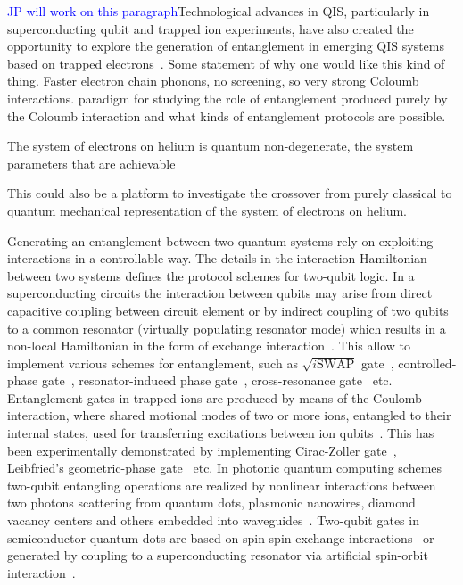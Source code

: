\documentclass[twocolumn,superscriptaddress,unsortedaddress,
 amsmath,amssymb,
 aps,
]{revtex4-2}
\begin{document}
\textcolor{blue}{JP will work on this paragraph}Technological advances in QIS, particularly in superconducting qubit and trapped ion experiments, have also created the opportunity to explore the generation of entanglement in emerging QIS systems based on trapped electrons~{}. Some statement of why one would like this kind of thing. Faster electron chain phonons, no screening, so very strong Coloumb interactions. paradigm for studying the role of entanglement produced purely by the Coloumb interaction and what kinds of entanglement protocols are possible.

The system of electrons on helium is quantum non-degenerate, the system parameters that are achievable 

This could also be a platform to investigate the crossover from purely classical to quantum mechanical representation of the system of electrons on helium. 

Generating an entanglement between two quantum systems rely on exploiting interactions in a controllable way. The details in the interaction Hamiltonian between two systems defines the protocol schemes for two-qubit logic. In a superconducting circuits the interaction between qubits may arise from direct capacitive coupling between circuit element or by indirect coupling of two qubits to a common resonator (virtually populating resonator mode) which results in a non-local Hamiltonian in the form of exchange interaction~\cite{blais2020circuit}. This allow to implement various schemes for entanglement, such as $\sqrt{i\text{SWAP}}$ gate~\cite{bialczak2010quantum}, controlled-phase gate~\cite{dicarlo2009demonstration}, resonator-induced phase gate~\cite{paik2016experimental}, cross-resonance gate~\cite{chow2011simple} etc. Entanglement gates in trapped ions are produced by means of the Coulomb interaction, where shared motional modes of two or more ions, entangled to their internal states, used for transferring excitations between ion qubits~\cite{cirac1995quantum}. This has been experimentally demonstrated by implementing Cirac-Zoller gate~\cite{turchette1998deterministic}, Leibfried’s geometric-phase gate~\cite{leibfried2003experimental} etc. In photonic quantum computing schemes two-qubit entangling operations are realized by nonlinear interactions between two photons scattering from quantum dots, plasmonic nanowires, diamond vacancy centers and others embedded into waveguides~\cite{bartlett2020universal}. Two-qubit gates in semiconductor quantum dots are based on spin-spin exchange interactions~\cite{brunner2011two,watson2018programmable} or generated by coupling to a superconducting resonator via artificial spin-orbit interaction~\cite{borjans2020resonant}.
\end{document}
